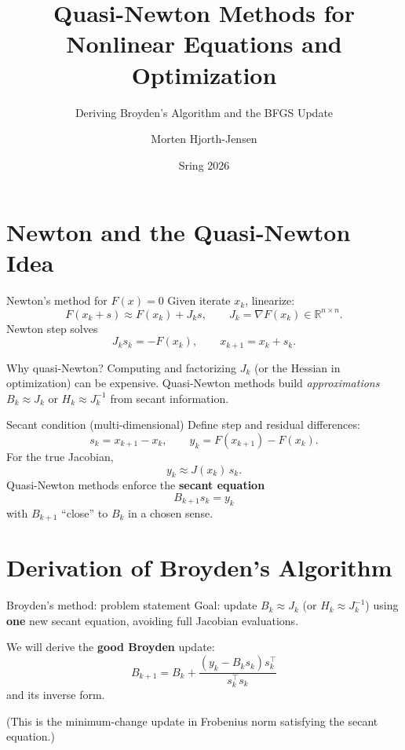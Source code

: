 \documentclass[aspectratio=169]{beamer}
\title{Quasi-Newton Methods for Nonlinear Equations and Optimization}
\subtitle{Deriving Broyden's Algorithm and the BFGS Update}
\author{Morten Hjorth-Jensen}
\date{Sring 2026}
\newcommand{\R}{\mathbb{R}}
\begin{document}
\begin{frame}
\titlepage
\end{frame}

\section{Newton and the Quasi-Newton Idea}

\begin{frame}{Newton's method for $F(x)=0$}
Given iterate $x_k$, linearize:
\[
F(x_k+s)\approx F(x_k)+J_k s,\qquad J_k = \nabla F(x_k)\in\R^{n\times n}.
\]
Newton step solves
\[
J_k s_k = -F(x_k),\qquad x_{k+1}=x_k+s_k.
\]
\begin{block}{Why quasi-Newton?}
Computing and factorizing $J_k$ (or the Hessian in optimization) can be expensive.
Quasi-Newton methods build \emph{approximations} $B_k\approx J_k$ or $H_k\approx J_k^{-1}$ from secant information.
\end{block}
\end{frame}

\begin{frame}{Secant condition (multi-dimensional)}
Define step and residual differences:
\[
s_k = x_{k+1}-x_k,\qquad y_k = F(x_{k+1})-F(x_k).
\]
For the true Jacobian,
\[
y_k \approx J(x_k)\, s_k.
\]
Quasi-Newton methods enforce the \textbf{secant equation}
\[
\boxed{B_{k+1}s_k = y_k}
\]
with $B_{k+1}$ ``close'' to $B_k$ in a chosen sense.
\end{frame}

\section{Derivation of Broyden's Algorithm}

\begin{frame}{Broyden's method: problem statement}
Goal: update $B_k\approx J_k$ (or $H_k\approx J_k^{-1}$) using \textbf{one} new secant equation,
avoiding full Jacobian evaluations.

We will derive the \textbf{good Broyden} update:
\[
\boxed{
B_{k+1} = B_k + \frac{(y_k - B_k s_k)s_k^\top}{s_k^\top s_k}
}
\]
and its inverse form.

\medskip
(This is the minimum-change update in Frobenius norm satisfying the secant equation.)
\end{frame}
\end{document}

